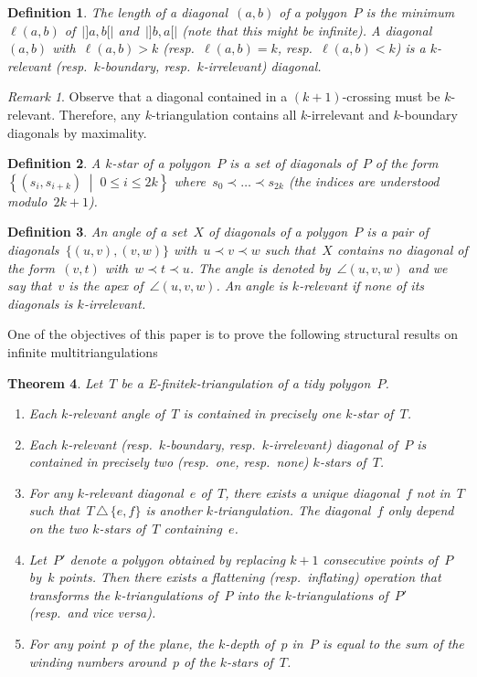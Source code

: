 \documentclass{amsart}
\newtheorem{theorem}{Theorem}[section]
\newtheorem{definition}[theorem]{Definition}
\theoremstyle{remark}
\newtheorem{remark}{Remark}[section]
\newcommand{\darkblue}{\color{darkblue}} %
\newcommand{\defn}[1]{\textsl{\darkblue #1}} %
\newcommand*{\ef}[0]{E-finite\xspace}
\newcommand*{\ktg}[0]{$k$-triangulation\xspace}
\newcommand{\cl}{\prec}
\newcommand{\set}[2]{\left\{ #1 \;\middle|\; #2 \right\}} %
\newcommand{\symdif}{\,\triangle\,} %
\newcommand{\viceversa}{\textit{vice versa}} %
\newcommand{\vincent}[1]{\todo[color=blue!30]{#1 \\ \hfill --- V.}}
\begin{document}
\begin{definition}
The \defn{length} of a diagonal~$(a,b)$ of a polygon~$P$ is the minimum~$\ell(a,b)$ of~$|{]a,b[}|$ and~$|{]b,a[}|$ (note that this might be infinite).
A diagonal~$(a,b)$ with~$\ell(a,b) > k$ (resp.~$\ell(a,b) = k$, resp.~$\ell(a,b) < k$) is a \defn{$k$-relevant} (resp.~\defn{$k$-boundary}, resp.~\defn{$k$-irrelevant}) diagonal.
\end{definition}

\begin{remark}
Observe that a diagonal contained in a $(k+1)$-crossing must be $k$-relevant.
Therefore, any \ktg contains all $k$-irrelevant and $k$-boundary diagonals by maximality.
\end{remark}


\begin{definition}
A \defn{$k$-star} of a polygon~$P$ is a set of diagonals of~$P$ of the form~$\set{(s_i, s_{i+k})}{0 \le i \le 2k}$ where~$s_0 \cl \dots \cl s_{2k}$ (the indices are understood modulo~$2k+1$).
\end{definition}

\begin{definition}
An \defn{angle} of a set~$X$ of diagonals of a polygon~$P$ is a pair of diagonals~$\{(u,v), (v,w)\}$ with~$u \cl v \cl w$ such that~$X$ contains no diagonal of the form~$(v,t)$ with~$w \cl t \cl u$. The angle is denoted by~$\angle(u,v,w)$ and we say that~$v$ is the \defn{apex} of~$\angle(u,v,w)$. An angle is \defn{$k$-relevant} if none of its diagonals is $k$-irrelevant. %
\end{definition}

One of the objectives of this paper is to prove the following structural results on infinite multitriangulations

\begin{theorem}
\label{thm:structureInfinite}
Let~$T$ be a \ef \ktg of a tidy polygon~$P$.
\begin{enumerate}
\item Each $k$-relevant angle of~$T$ is contained in precisely one $k$-star of~$T$.
\item Each $k$-relevant (resp.~$k$-boundary, resp.~$k$-irrelevant) diagonal of~$P$ is contained in precisely two (resp.~one, resp.~none) $k$-stars of~$T$.
\item For any $k$-relevant diagonal~$e$ of~$T$, there exists a unique diagonal~$f$ not in~$T$ such that~$T \symdif \{e,f\}$ is another $k$-triangulation. The diagonal~$f$ only depend on the two $k$-stars of~$T$ containing~$e$.
\item Let~$P'$ denote a polygon obtained by replacing $k+1$ consecutive points of~$P$ by~$k$ points. Then there exists a flattening (resp.~inflating) operation that transforms the \ktg{}s of~$P$ into the \ktg{}s of~$P'$ (resp.~and \viceversa).
\item For any point~$p$ of the plane, the $k$-depth of~$p$ in~$P$ is equal to the sum of the winding numbers around~$p$ of the $k$-stars of~$T$.
\vincent{Vrai ?}
\end{enumerate}
\end{theorem}
\end{document}
